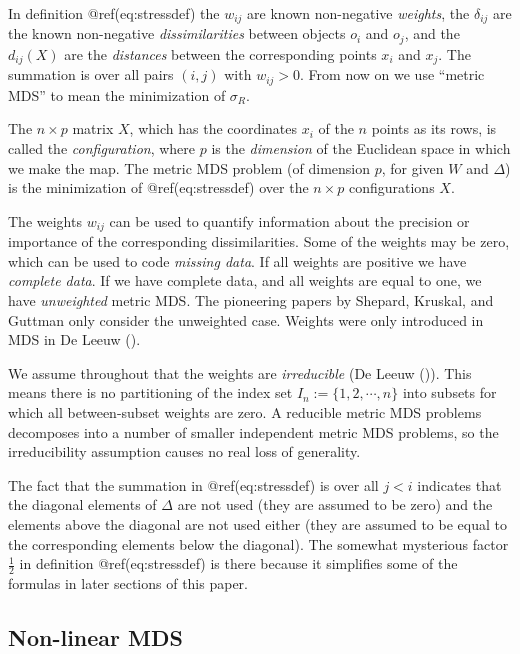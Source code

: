 \documentclass[
  12pt,
  letterpaper,
  DIV=11,
  numbers=noendperiod]{scrartcl}
\begin{document}
In definition @ref(eq:stressdef) the \(w_{ij}\) are known non-negative
\emph{weights}, the \(\delta_{ij}\) are the known non-negative
\emph{dissimilarities} between objects \(o_i\) and \(o_j\), and the
\(d_{ij}(X)\) are the \emph{distances} between the corresponding points
\(x_i\) and \(x_j\). The summation is over all pairs \((i,j)\) with
\(w_{ij}>0\). From now on we use ``metric MDS'' to mean the minimization
of \(\sigma_R\).

The \(n\times p\) matrix \(X\), which has the coordinates \(x_i\) of the
\(n\) points as its rows, is called the \emph{configuration}, where
\(p\) is the \emph{dimension} of the Euclidean space in which we make
the map. The metric MDS problem (of dimension \(p\), for given \(W\) and
\(\Delta\)) is the minimization of @ref(eq:stressdef) over the
\(n\times p\) configurations \(X\).

The weights \(w_{ij}\) can be used to quantify information about the
precision or importance of the corresponding dissimilarities. Some of
the weights may be zero, which can be used to code \emph{missing data}.
If all weights are positive we have \emph{complete data}. If we have
complete data, and all weights are equal to one, we have
\emph{unweighted} metric MDS. The pioneering papers by Shepard, Kruskal,
and Guttman only consider the unweighted case. Weights were only
introduced in MDS in De Leeuw ().

We assume throughout that the weights are \emph{irreducible} (De Leeuw
()). This means there is no
partitioning of the index set \(I_n:=\{1,2,\cdots,n\}\) into subsets for
which all between-subset weights are zero. A reducible metric MDS
problems decomposes into a number of smaller independent metric MDS
problems, so the irreducibility assumption causes no real loss of
generality.

The fact that the summation in @ref(eq:stressdef) is over all \(j<i\)
indicates that the diagonal elements of \(\Delta\) are not used (they
are assumed to be zero) and the elements above the diagonal are not used
either (they are assumed to be equal to the corresponding elements below
the diagonal). The somewhat mysterious factor \(\frac12\) in definition
@ref(eq:stressdef) is there because it simplifies some of the formulas
in later sections of this paper.

\subsection{Non-linear MDS}\label{non-linear-mds}
\end{document}
